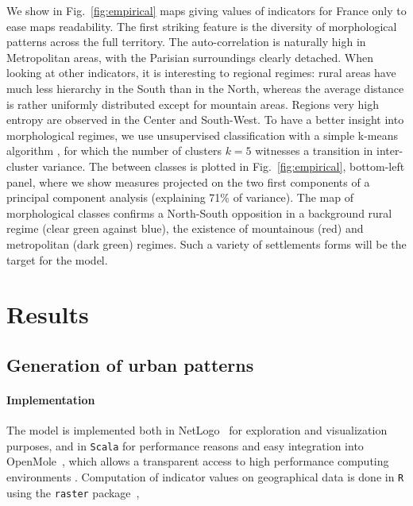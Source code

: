 \documentclass[10pt,letterpaper]{article}
\begin{document}
We show in Fig.~\ref{fig:empirical} maps giving values of indicators for France only to ease maps readability. The first striking feature is the diversity of morphological patterns across the full territory. The auto-correlation is naturally high in Metropolitan areas, with the Parisian surroundings clearly detached. When looking at other indicators, it is interesting to  regional regimes: rural areas have much less hierarchy in the South than in the North, whereas the average distance is rather uniformly distributed except for mountain areas. Regions  very high entropy are observed in the Center and South-West. To have a better insight into morphological regimes, we use unsupervised classification with a simple k-means algorithm , for which the number of clusters $k=5$ witnesses a transition in inter-cluster variance. The  between classes is plotted in Fig.~\ref{fig:empirical}, bottom-left panel, where we show measures projected on the two first components of a principal component analysis (explaining 71\% of variance). The map of morphological classes confirms a North-South opposition in a background rural regime (clear green against blue), the existence of mountainous (red) and metropolitan (dark green) regimes. Such a variety of settlements forms will be the target for the model.






\section*{Results}



\subsection*{Generation of urban patterns}


\paragraph{Implementation}


The model is implemented both in NetLogo~\cite{wilensky1999netlogo} for exploration and visualization purposes, and in \texttt{Scala} for performance reasons and easy integration into  OpenMole~\cite{reuillon2013openmole}, which allows a transparent access to high performance computing environments . Computation of indicator values on geographical data is done in \texttt{R} using the \texttt{raster} package~\cite{hijmans2015geographic}, 
\end{document}

